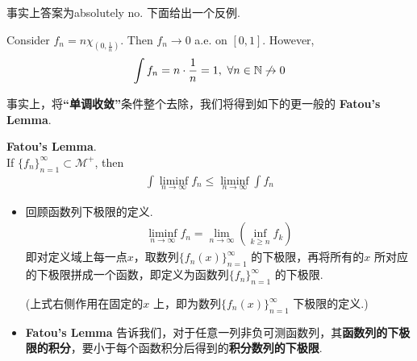  	事实上答案为absolutely no. 下面给出一个反例.
 	
 	\begin{example}\label{ex 3.1.1}
 		Consider $f_n = n\chi_{(0 , \frac{1}{n})}$. Then $f_n \to 0$ a.e. on $[0 , 1]$. However,
 		\begin{align}
 			\int{f_n} = n \cdot \frac{1}{n} = 1 , \,\, \forall n \in \mathbb{N} \not\to 0
 		\end{align}
 	\end{example}
 
 	\newpage
 	事实上，将\textbf{“单调收敛”}条件整个去除，我们将得到如下的更一般的 \textbf{Fatou's Lemma}.
 	\begin{thm}\label{thm 3.1.6}
 		\textbf{Fatou's Lemma}.\\
 		If $\{ f_n \}_{n = 1}^{\infty} \subset \mathcal{M}^{+}$, then
 		\begin{align}
 			\int{\liminf_{n \to \infty}{f_n}} \leq \liminf_{n \to \infty}{\int{f_n}}
 		\end{align}
 		
 		\vspace{1em}
 		\begin{rmk}
 			\begin{itemize}
 				\item 回顾函数列下极限的定义.
 				\begin{align}
 					\liminf_{n \to \infty}{f_n} = \lim_{n \to \infty}{\left( \inf_{k \geq n}{f_k} \right)}
 				\end{align}
 				即对定义域上每一点$x$，取数列$\{ f_{n}(x) \}_{n = 1}^{\infty}$ 的下极限，再将所有的$x$ 所对应的下极限拼成一个函数，即定义为函数列$\{ f_n \}_{n = 1}^{\infty}$ 的下极限.
 				\begin{center}
 					(上式右侧作用在固定的$x$ 上，即为数列$\{ f_{n}(x) \}_{n = 1}^{\infty}$ 下极限的定义.)
 				\end{center} 
 			
 			\vspace{1em}
 			\item \textbf{Fatou's Lemma} 告诉我们，对于任意一列非负可测函数列，其\textbf{函数列的下极限的积分}，要小于每个函数积分后得到的\textbf{积分数列的下极限}.
 			\end{itemize}
 		\end{rmk}
 	

\end{thm}
